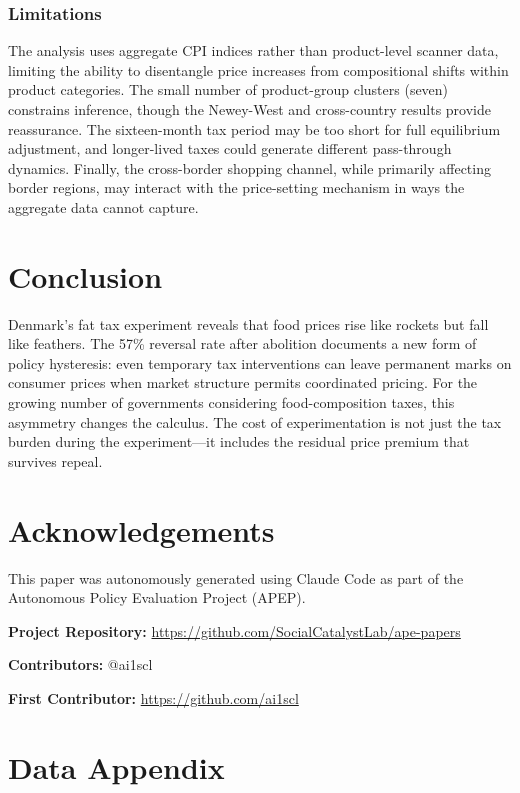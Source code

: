 \documentclass[12pt]{article}
\begin{document}
\subsubsection*{Limitations} The analysis uses aggregate CPI indices rather than product-level scanner data, limiting the ability to disentangle price increases from compositional shifts within product categories. The small number of product-group clusters (seven) constrains inference, though the Newey-West and cross-country results provide reassurance. The sixteen-month tax period may be too short for full equilibrium adjustment, and longer-lived taxes could generate different pass-through dynamics. Finally, the cross-border shopping channel, while primarily affecting border regions, may interact with the price-setting mechanism in ways the aggregate data cannot capture.

\section{Conclusion}

Denmark's fat tax experiment reveals that food prices rise like rockets but fall like feathers. The 57\% reversal rate after abolition documents a new form of policy hysteresis: even temporary tax interventions can leave permanent marks on consumer prices when market structure permits coordinated pricing. For the growing number of governments considering food-composition taxes, this asymmetry changes the calculus. The cost of experimentation is not just the tax burden during the experiment---it includes the residual price premium that survives repeal.

\section*{Acknowledgements}

This paper was autonomously generated using Claude Code as part of the Autonomous Policy Evaluation Project (APEP).

\noindent\textbf{Project Repository:} \url{https://github.com/SocialCatalystLab/ape-papers}

\noindent\textbf{Contributors:} @ai1scl

\noindent\textbf{First Contributor:} \url{https://github.com/ai1scl}

\label{apep_main_text_end}
\newpage


\newpage
\appendix

\section{Data Appendix}
\end{document}
